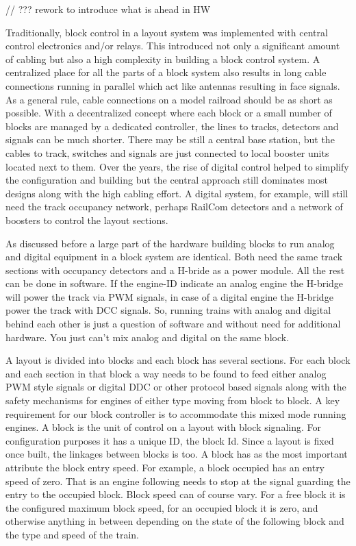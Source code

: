 
// ??? rework to introduce what is ahead in HW


Traditionally, block control in a layout system was implemented with central control electronics and/or relays. This introduced not only a significant amount of cabling but also a high complexity in building a block control system. A centralized place for all the parts of a block system also results in long cable connections running in parallel which act like antennas resulting in face signals. As a general rule, cable connections on a model railroad should be as short as possible. With a decentralized concept where each block or a small number of blocks are managed by a dedicated controller, the lines to tracks, detectors and signals can be much shorter. There may be still a central base station, but the cables to track, switches and signals are just connected to local booster units located next to them. Over the years, the rise of digital control helped to simplify the configuration and building but the central approach still dominates most designs along with the high cabling effort. A digital system, for example, will still need the track occupancy network, perhaps RailCom detectors and a network of boosters to control the layout sections.

As discussed before a large part of the hardware building blocks to run analog and digital equipment in a block system are identical. Both need the same track sections with occupancy detectors and a H-bride as a power module. All the rest can be done in software. If the engine-ID indicate an analog engine the H-bridge will power the track via PWM signals, in case of a digital engine the H-bridge power the track with DCC signals. So, running trains with analog and digital behind each other is just a question of software and without need for additional hardware. You just can’t mix analog and digital on the same block.

A layout is divided into blocks and each block has several sections. For each block and each section in that block a way needs to be found to feed either analog PWM style signals or digital DDC or other protocol based signals along with the safety mechanisms for engines of either type moving from block to block. A key requirement for our block controller is to accommodate this mixed mode running engines. A block is the unit of control on a layout with block signaling. For configuration purposes it has a unique ID, the block Id. Since a layout is fixed once built, the linkages between blocks is too. A block has as the most important attribute the block entry speed. For example, a block occupied has an entry speed of zero. That is an engine following needs to stop at the signal guarding the entry to the occupied block. Block speed can of course vary. For a free block it is the configured maximum block speed, for an occupied block it is zero, and otherwise anything in between depending on the state of the following block and the type and speed of the train.

